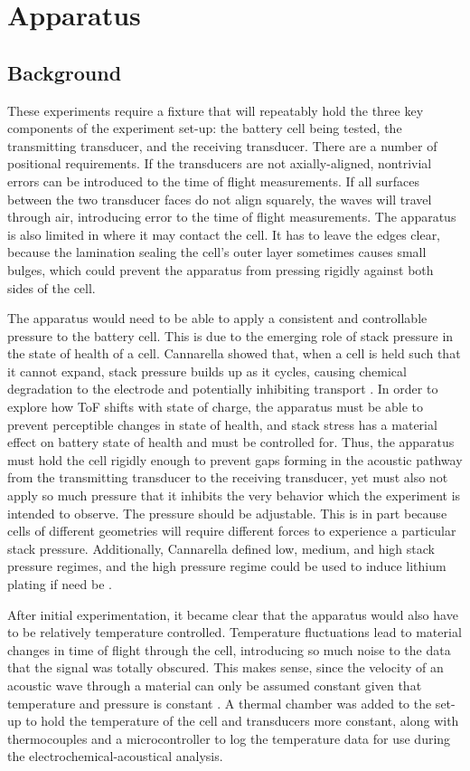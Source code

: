 \chapter{Apparatus}

\section{Background}
These experiments require a fixture that will repeatably hold the three key components of the experiment set-up: the battery cell being tested, the transmitting transducer, and the receiving transducer. 
There are a number of positional requirements. 
If the transducers are not axially-aligned, nontrivial errors can be introduced to the time of flight measurements.
If all surfaces between the two transducer faces do not align squarely, the waves will travel through air, introducing error to the time of flight measurements. 
The apparatus is also limited in where it may contact the cell. It has to leave the edges clear, because the lamination sealing the cell's outer layer sometimes causes small bulges, which could prevent the apparatus from pressing rigidly against both sides of the cell.

The apparatus would need to be able to apply a consistent and controllable pressure to the battery cell. 
This is due to the emerging role of stack pressure in the state of health of a cell. 
Cannarella showed that, when a cell is held such that it cannot expand, stack pressure builds up as it cycles, causing chemical degradation to the electrode and potentially inhibiting transport \cite{STACK-STRESS}. In order to explore how ToF shifts with state of charge, the apparatus must be able to prevent perceptible changes in state of health, and stack stress has a material effect on battery state of health and must be controlled for.
Thus, the apparatus must hold the cell rigidly enough to prevent gaps forming in the acoustic pathway from the transmitting transducer to the receiving transducer, yet must also not apply so much pressure that it inhibits the very behavior which the experiment is intended to observe. 
The pressure should be adjustable. This is in part because cells of different geometries will require different forces to experience a particular stack pressure. 
Additionally, Cannarella defined low, medium, and high stack pressure regimes, and the high pressure regime could be used to induce lithium plating if need be \cite{STACK-STRESS}.

After initial experimentation, it became clear that the apparatus would also have to be relatively temperature controlled. 
Temperature fluctuations lead to material changes in time of flight through the cell, introducing so much noise to the data that the signal was totally obscured. This makes sense, since the velocity of an acoustic wave through a material can only be assumed constant given that temperature and pressure is constant \cite{OLYMPUS}.
A thermal chamber was added to the set-up to hold the temperature of the cell and transducers more constant, along with thermocouples and a microcontroller to log the temperature data for use during the electrochemical-acoustical analysis.

